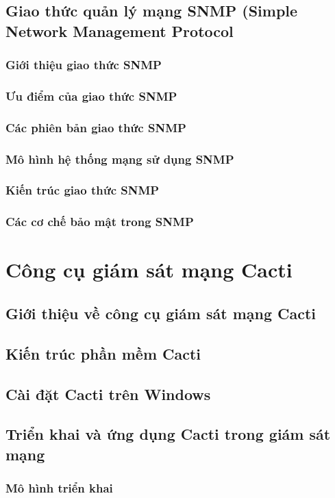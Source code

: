 \documentclass[12pt,oneside,a4paper]{article}
\begin{document}
\subsection{Giao thức quản lý mạng SNMP (Simple Network Management Protocol}
\subsubsection{Giới thiệu giao thức SNMP}
\subsubsection{Ưu điểm của giao thức SNMP}
\subsubsection{Các phiên bản giao thức SNMP}
\subsubsection{Mô hình hệ thống mạng sử dụng SNMP}
\subsubsection{Kiến trúc giao thức SNMP}
\subsubsection{Các cơ chế bảo mật trong SNMP}

\section{Công cụ giám sát mạng Cacti}
\subsection{Giới thiệu về công cụ giám sát mạng Cacti}
\subsection{Kiến trúc phần mềm Cacti}
\subsection{Cài đặt Cacti trên Windows}
\subsection{Triển khai và ứng dụng Cacti trong giám sát mạng}
\subsubsection{Mô hình triển khai}
\end{document}
